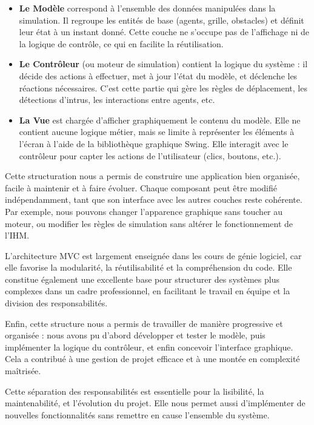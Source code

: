 \begin{itemize}
    \item \textbf{Le Modèle} correspond à l’ensemble des données manipulées dans la simulation. Il regroupe les entités de base (agents, grille, obstacles) et définit leur état à un instant donné. Cette couche ne s’occupe pas de l’affichage ni de la logique de contrôle, ce qui en facilite la réutilisation.

    \item \textbf{Le Contrôleur} (ou moteur de simulation) contient la logique du système : il décide des actions à effectuer, met à jour l’état du modèle, et déclenche les réactions nécessaires. C’est cette partie qui gère les règles de déplacement, les détections d’intrus, les interactions entre agents, etc.

    \item \textbf{La Vue} est chargée d’afficher graphiquement le contenu du modèle. Elle ne contient aucune logique métier, mais se limite à représenter les éléments à l’écran à l’aide de la bibliothèque graphique Swing. Elle interagit avec le contrôleur pour capter les actions de l’utilisateur (clics, boutons, etc.).
\end{itemize}

Cette structuration nous a permis de construire une application bien organisée, facile à maintenir et à faire évoluer. Chaque composant peut être modifié indépendamment, tant que son interface avec les autres couches reste cohérente. Par exemple, nous pouvons changer l’apparence graphique sans toucher au moteur, ou modifier les règles de simulation sans altérer le fonctionnement de l’IHM.

L’architecture MVC est largement enseignée dans les cours de génie logiciel, car elle favorise la modularité, la réutilisabilité et la compréhension du code. Elle constitue également une excellente base pour structurer des systèmes plus complexes dans un cadre professionnel, en facilitant le travail en équipe et la division des responsabilités.

Enfin, cette structure nous a permis de travailler de manière progressive et organisée : nous avons pu d’abord développer et tester le modèle, puis implémenter la logique du contrôleur, et enfin concevoir l’interface graphique. Cela a contribué à une gestion de projet efficace et à une montée en complexité maîtrisée.


Cette séparation des responsabilités est essentielle pour la lisibilité, la maintenabilité, et l’évolution du projet. Elle nous permet aussi d’implémenter de nouvelles fonctionnalités sans remettre en cause l’ensemble du système.
